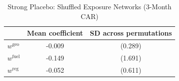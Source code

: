 \begin{table}[!htbp]
\centering
\caption{Strong Placebo: Shuffled Exposure Networks (3-Month CAR)}
\label{tab:placebo_shuffle}
\begin{tabular}{lcc}
\toprule
 & Mean coefficient & SD across permutations \\
\midrule
$w^{\mathrm{geo}}$ & -0.009 & (0.289) \\
$w^{\mathrm{fuel}}$ & -0.149 & (1.691) \\
$w^{\mathrm{reg}}$ & -0.052 & (0.611) \\
\bottomrule
\end{tabular}
\end{table}